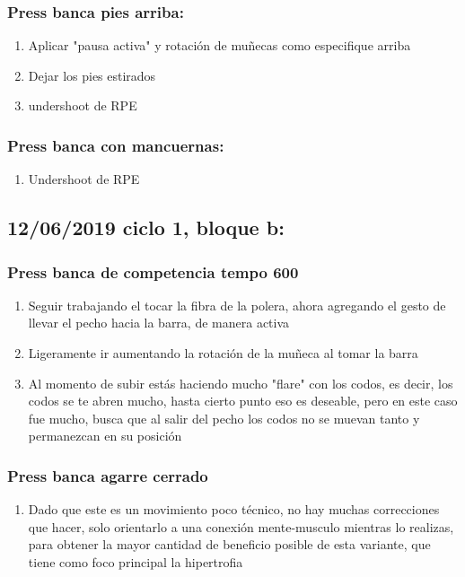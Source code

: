 \documentclass[11pt]{article}
\begin{document}
\subsubsection{Press banca pies arriba:}
\label{sec:orgbfb8a13}

\begin{enumerate}
\item Aplicar "pausa activa" y rotación de muñecas como especifique
arriba
\item Dejar los pies estirados
\item undershoot de RPE
\end{enumerate}

\subsubsection{Press banca con mancuernas:}
\label{sec:org4b5c401}

\begin{enumerate}
\item Undershoot de RPE
\end{enumerate}

\subsection{12/06/2019 ciclo 1, bloque b:}
\label{sec:orgf53f34b}
\subsubsection{Press banca de competencia tempo 600}
\label{sec:orgf2c0c55}
\begin{enumerate}
\item Seguir trabajando el tocar la fibra de la polera, ahora agregando
el gesto de llevar el pecho hacia la barra, de manera activa
\item Ligeramente ir aumentando la rotación de la muñeca al tomar la
barra
\item Al momento de subir estás haciendo mucho "flare" con los codos, es
decir, los codos se te abren mucho, hasta cierto punto eso es
deseable, pero en este caso fue mucho, busca que al salir del pecho
los codos no se muevan tanto y permanezcan en su posición
\end{enumerate}
\subsubsection{Press banca agarre cerrado}
\label{sec:orgad48579}
\begin{enumerate}
\item Dado que este es un movimiento poco técnico, no hay muchas
correcciones que hacer, solo orientarlo a una conexión
mente-musculo mientras lo realizas, para obtener la mayor cantidad
de beneficio posible de esta variante, que tiene como foco
principal la hipertrofia
\end{enumerate}
\end{document}
